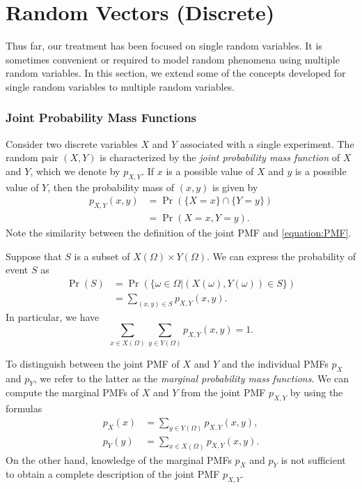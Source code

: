 \chapter{Random Vectors (Discrete)}
\label{chapter:RandomVectorsDiscrete}

Thus far, our treatment has been focused on single random variables.
It is sometimes convenient or required to model random phenomena using multiple random variables.
In this section, we extend some of the concepts developed for single random variables to multiple random variables.

\subsection{Joint Probability Mass Functions}

Consider two discrete variables $X$ and $Y$ associated with a single experiment.
The random pair $(X, Y)$ is characterized by the \emph{joint probability mass function} of $X$ and $Y$, which we denote by $p_{X,Y}$.
If $x$ is a possible value of $X$ and $y$ is a possible value of $Y$, then the probability mass of $(x, y)$ is given by
\begin{equation*}
\begin{split}
p_{X,Y} (x, y) &= \Pr ( \{ X = x \} \cap \{ Y = y \} ) \\
&= \Pr ( X = x, Y = y ).
\end{split}
\end{equation*}
Note the similarity between the definition of the joint PMF and \eqref{equation:PMF}.

Suppose that $S$ is a subset of $X(\Omega) \times Y(\Omega)$.
We can express the probability of event $S$ as
\begin{equation*}
\begin{split}
\Pr (S) &= \Pr (\{ \omega \in \Omega | (X(\omega), Y(\omega)) \in S \}) \\
&= \sum_{(x,y) \in S} p_{X,Y} (x, y) .
\end{split}
\end{equation*}
In particular, we have
\begin{equation*}
\sum_{x \in X(\Omega)} \sum_{y \in Y(\Omega)} p_{X,Y} (x, y) = 1.
\end{equation*}

To distinguish between the joint PMF of $X$ and $Y$ and the individual PMFs $p_X$ and $p_Y$, we refer to the latter as the \emph{marginal probability mass functions}.
We can compute the marginal PMFs of $X$ and $Y$ from the joint PMF $p_{X,Y}$ by using the formulas
\begin{align*}
p_X (x) &= \sum_{y \in Y(\Omega)} p_{X,Y} (x,y), \\
p_Y (y) &= \sum_{x \in X(\Omega)} p_{X,Y} (x,y).
\end{align*}
On the other hand, knowledge of the marginal PMFs $p_X$ and $p_Y$ is not sufficient to obtain a complete description of the joint PMF $p_{X,Y}$.

